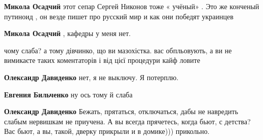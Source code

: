 \begin{itemize}
\begin{itemize}
\textbf{Микола Осадчий} этот сепар Сергей Никонов тоже « учёный» . Это же конченый путиноид , он везде пишет про русский мир и как они победят украинцев

 
\textbf{Микола Осадчий} , кафедры у меня нет.

\end{itemize}

 

чому слаба? а тому дівчинко, що ви мазохістка. вас обпльовують, а ви не
вимикаєте таких коментаторів і від цієї процедури кайф ловите

\begin{itemize}
 
\textbf{Олександр Давиденко} нет, я не выключу. Я потерплю.

 
\textbf{Евгения Бильченко} ну ось тому й слаба

 
\textbf{Олександр Давиденко} Бежать, прятаться, отключаться, дабы не навредить слабым нервишкам не приучена. А вы всегда прячетесь, когда бьют, с детства? Вас бьют, а вы, такой, дверку прикрыли и в домике))) прикольно.

 

\end{itemize}
\end{itemize}
